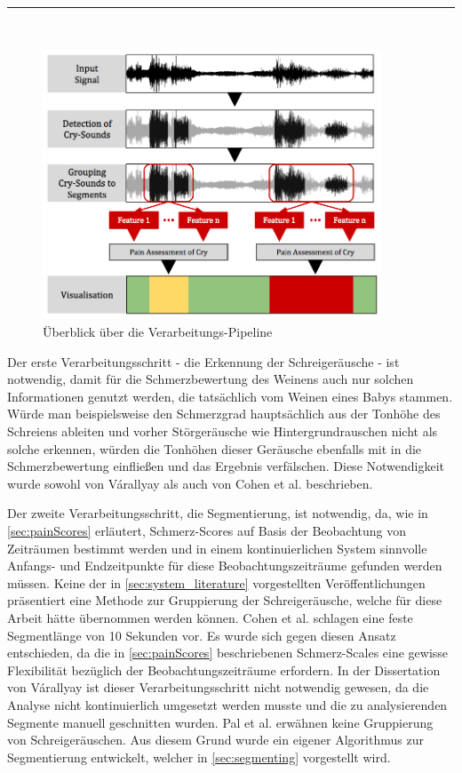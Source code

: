 \noindent\rule{\linewidth}{0.3pt} \\

\begin{figure}[h]
	\centering
	\includegraphics[width=0.9\textwidth]{bilder/konzept04.png}
	\caption{Überblick über die Verarbeitungs-Pipeline}
	\label{img:architecture-overview}
\end{figure}


Der erste Verarbeitungsschritt - die Erkennung der Schreigeräusche - ist notwendig, damit für die Schmerzbewertung des Weinens auch nur solchen Informationen genutzt werden, die tatsächlich vom Weinen eines Babys stammen. Würde man beispielsweise den Schmerzgrad hauptsächlich aus der Tonhöhe des Schreiens ableiten und vorher Störgeräusche wie Hintergrundrauschen nicht als solche erkennen, würden die Tonhöhen dieser Geräusche ebenfalls mit in die Schmerzbewertung einfließen und das Ergebnis verfälschen. Diese Notwendigkeit wurde sowohl von Várallyay \cite{cry_thesis} als auch von Cohen et al. \cite{cohenCry} beschrieben. 

Der zweite Verarbeitungsschritt, die Segmentierung, ist notwendig, da, wie in \autoref{sec:painScores} erläutert, Schmerz-Scores auf Basis der Beobachtung von Zeiträumen bestimmt werden und in einem kontinuierlichen System sinnvolle Anfangs- und Endzeitpunkte für diese Beobachtungszeiträume gefunden werden müssen. Keine der in \autoref{sec:system_literature} vorgestellten Veröffentlichungen präsentiert eine Methode zur Gruppierung der Schreigeräusche, welche für diese Arbeit hätte übernommen werden können. Cohen et al. \cite{cohenCry} schlagen eine feste Segmentlänge von 10 Sekunden vor. Es wurde sich gegen diesen Ansatz entschieden, da die in \autoref{sec:painScores} beschriebenen Schmerz-Scales eine gewisse Flexibilität bezüglich der Beobachtungszeiträume erfordern. In der Dissertation von Várallyay \cite{cry_thesis} ist dieser Verarbeitungsschritt nicht notwendig gewesen, da die Analyse nicht kontinuierlich umgesetzt werden musste und die zu analysierenden Segmente manuell geschnitten wurden. Pal et al. \cite{palEmotion} erwähnen keine Gruppierung von Schreigeräuschen. Aus diesem Grund wurde ein eigener Algorithmus zur Segmentierung entwickelt, welcher in \autoref{sec:segmenting} vorgestellt wird.

